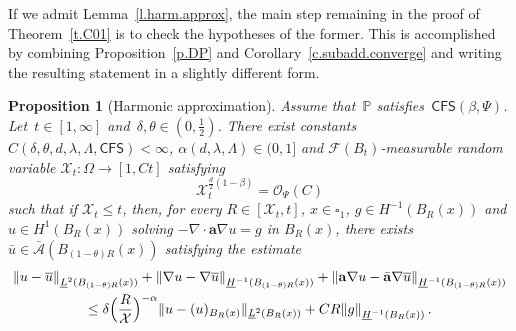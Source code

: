 \documentclass[11pt]{article} %
\let\oldsquare\square %
\renewcommand{\square}{\oldsquare}
\numberwithin{equation}{section}
\newtheorem{proposition}[theorem]{Proposition}
\theoremstyle{definition}
\let\originalleft\left
\let\originalright\right
\renewcommand{\left}{\mathopen{}\mathclose\bgroup\originalleft}
\renewcommand{\right}{\aftergroup\egroup\originalright}
\renewcommand{\a}{\mathbf{a}}
\newcommand{\ahom}{\bar{\a}}
\newcommand{\cu}{\square}
\newcommand{\F}{\mathcal{F}}
\renewcommand{\P}{\mathbb{P}}
\newcommand{\X}{\mathcal{X}}
\renewcommand{\O}{\mathcal{O}}
\newcommand{\CFS}{\mathsf{CFS}}
\newcommand{\A}{\mathcal{A}}
\newcommand{\Ahom}{\bar{\A}}
\begin{document}
\smallskip

If we admit Lemma~\ref{l.harm.approx}, the main step remaining in the proof of Theorem~\ref{t.C01} is to check the hypotheses of the former. This is accomplished by combining Proposition~\ref{p.DP} and 
Corollary~\ref{c.subadd.converge} and writing the resulting statement in a slightly different form. 

\begin{proposition}[Harmonic approximation]
\label{p.harm.we.have}
Assume that~$\P$ satisfies~$\CFS(\beta,\Psi)$. Let~$t \in [1,\infty]$ and~$\delta,\theta \in (0,\frac12)$. There exist constants~$C(\delta,\theta,d,\lambda,\Lambda,\CFS)<\infty$, $\alpha(d,\lambda,\Lambda) \in (0,1]$ and $\F(B_t)$-measurable random variable 
$\X_t:\Omega \to [1,Ct]$ satisfying
\begin{equation*}
\label{e.XSI}
\X_t^{\frac d2(1-\beta)} 
= 
\O_{\Psi}(C) 
\end{equation*}
such that if $\X_t \leq t$, then, for every $R \in [\X_t,t]$, $x\in \cu_1$, $g \in H^{-1}(B_R(x))$ and $u \in H^1(B_R(x))$ solving $-\nabla \cdot \a \nabla u = g$ in $B_R(x)$, there exists $ \bar u  \in \Ahom(B_{(1-\theta)R}(x))$  
satisfying the estimate
\begin{multline}
\label{e.harm.we.have1}
\left\| u - \overline{u}  \right\|_{\underline{L}^2(B_{(1-\theta)R}(x))} 
+
\left\| \nabla u - \nabla \overline{u}  \right\|_{\underline{H}^{-1}(B_{(1-\theta)R}(x))} 
+
\left\| \a \nabla u - \ahom \nabla \overline{u}  \right\|_{\underline{H}^{-1}(B_{(1-\theta)R}(x))} 
\\
\leq 
\delta\Bigl( \frac{R}{\X} \Bigr)^{-\alpha} 
\| u - (u)_{B_R(x)}\|_{\underline{L}^{2} \left( B_{R}(x) \right)}
+
CR \left\| g \right\|_{\underline{H}^{-1}(B_R(x))}
\,.
\end{multline}
\end{proposition}
\end{document}
